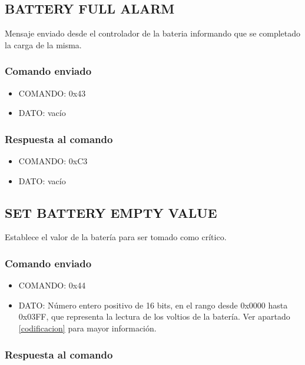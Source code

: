 \documentclass[a4paper,10pt]{article}
\begin{document}
\subsection{BATTERY FULL ALARM}
\label{battery_full_alarm}

Mensaje enviado desde el controlador de la bateria informando que se completado la carga de la misma.

\subsubsection*{Comando enviado}

\begin{itemize}
	\item{COMANDO:} 0x43
	\item{DATO:} vac\'io
\end{itemize}

\subsubsection*{Respuesta al comando}

\begin{itemize}
	\item{COMANDO:} 0xC3
	\item{DATO:} vac\'io
\end{itemize}

\subsection{SET BATTERY EMPTY VALUE}
\label{set_battery_empty_value}

Establece el valor de la bater\'ia para ser tomado como cr\'itico.

\subsubsection*{Comando enviado}

\begin{itemize}
	\item{COMANDO:} 0x44
	\item{DATO:} N\'umero entero positivo de 16 bits, en el rango desde 0x0000 hasta 0x03FF, que representa la lectura de los voltios de la bater\'ia.
		Ver apartado \ref{codificacion} para mayor informaci\'on.
\end{itemize}

\subsubsection*{Respuesta al comando}
\end{document}
